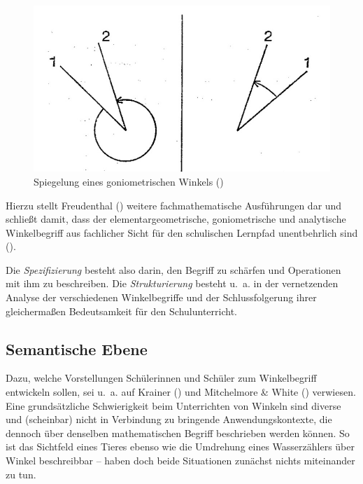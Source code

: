 \documentclass[
]{scrbook}
\theoremstyle{definition}
\theoremstyle{definition}
\theoremstyle{definition}
\theoremstyle{definition}
\theoremstyle{remark}
\begin{document}
\begin{figure}

{\centering \includegraphics[width=0.5\linewidth]{pictures/1-FreudenthalWinkelSpiegeln} 

}

\caption{Spiegelung eines goniometrischen Winkels ()}\label{fig:FreudenthalWinkelSpiegeln}
\end{figure}

Hierzu stellt Freudenthal () weitere fachmathematische Ausführungen dar und schließt damit, dass der elementargeometrische, goniometrische und analytische Winkelbegriff aus fachlicher Sicht für den schulischen Lernpfad unentbehrlich sind ().

Die \emph{Spezifizierung} besteht also darin, den Begriff zu schärfen und Operationen mit ihm zu beschreiben. Die \emph{Strukturierung} besteht u.~a. in der vernetzenden Analyse der verschiedenen Winkelbegriffe und der Schlussfolgerung ihrer gleichermaßen Bedeutsamkeit für den Schulunterricht.

\subsection{Semantische Ebene}\label{semantische-ebene}

Dazu, welche Vorstellungen Schülerinnen und Schüler zum Winkelbegriff entwickeln sollen, sei u.~a. auf Krainer () und Mitchelmore \& White () verwiesen. Eine grundsätzliche Schwierigkeit beim Unterrichten von Winkeln sind diverse und (scheinbar) nicht in Verbindung zu bringende Anwendungskontexte, die dennoch über denselben mathematischen Begriff beschrieben werden können. So ist das Sichtfeld eines Tieres ebenso wie die Umdrehung eines Wasserzählers über Winkel beschreibbar -- haben doch beide Situationen zunächst nichts miteinander zu tun.
\end{document}
